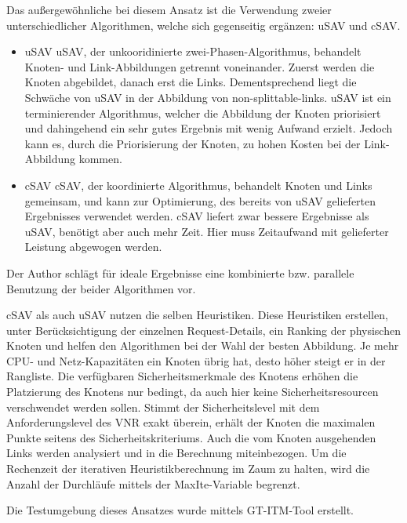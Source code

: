 \documentclass{lni}
\begin{document}
Das außergewöhnliche bei diesem Ansatz ist die Verwendung zweier unterschiedlicher Algorithmen, welche sich gegenseitig ergänzen: uSAV und cSAV.
\begin{itemize}
	\item uSAV \newline
	uSAV, der unkooridinierte zwei-Phasen-Algorithmus, behandelt Knoten- und Link-Abbildungen getrennt voneinander. Zuerst werden die Knoten abgebildet, danach erst die Links. Dementsprechend liegt die Schwäche von uSAV in der Abbildung von non-splittable-links. uSAV ist ein terminierender Algorithmus, welcher die Abbildung der Knoten priorisiert und dahingehend ein sehr gutes Ergebnis mit wenig Aufwand erzielt. Jedoch kann es, durch die Priorisierung der Knoten, zu hohen Kosten bei der Link-Abbildung kommen.

	\item cSAV \newline
	cSAV, der koordinierte Algorithmus, behandelt Knoten und Links gemeinsam, und kann zur Optimierung, des bereits von uSAV gelieferten Ergebnisses verwendet werden. cSAV liefert zwar bessere Ergebnisse als uSAV, benötigt aber auch mehr Zeit. Hier muss Zeitaufwand mit gelieferter Leistung abgewogen werden.

\end{itemize} 

Der Author schlägt für ideale Ergebnisse eine kombinierte bzw. parallele Benutzung der beider Algorithmen vor. 

cSAV als auch uSAV nutzen die selben Heuristiken. Diese Heuristiken erstellen, unter Berücksichtigung der einzelnen Request-Details, ein Ranking der physischen Knoten und helfen den Algorithmen bei der Wahl der besten Abbildung. Je mehr CPU- und Netz-Kapazitäten ein Knoten übrig hat, desto höher steigt er in der Rangliste. Die verfügbaren Sicherheitsmerkmale des Knotens erhöhen die Platzierung des Knotens nur bedingt, da auch hier keine Sicherheitsresourcen verschwendet werden sollen. Stimmt der Sicherheitslevel mit dem Anforderungslevel des VNR exakt überein, erhält der Knoten die maximalen Punkte seitens des Sicherheitskriteriums. Auch die vom Knoten ausgehenden Links werden analysiert und in die Berechnung miteinbezogen. Um die Rechenzeit der iterativen Heuristikberechnung im Zaum zu halten, wird die Anzahl der Durchläufe mittels der MaxIte-Variable begrenzt. 



Die Testumgebung dieses Ansatzes wurde mittels GT-ITM-Tool erstellt. \cite{GT-ITM-Tool} 
\end{document}
